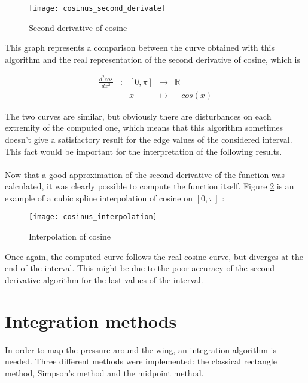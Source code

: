 \documentclass{article}
\begin{document}
\begin{figure}[h]
  \centering
  \caption{Second derivative of cosine}
  \texttt{[image: cosinus\_second\_derivate]}
  \label{cosinus_second_derivate}
\end{figure}

This graph represents a comparison between the curve obtained with this algorithm and the real representation of the second derivative of cosine, which is

\begin{equation}
\begin{array}{ccccl}
\frac{d^2 cos}{dx^2} & : & [0, \pi] & \to & \mathbb{R} \\
 & & x & \mapsto & -cos(x)
\end{array}
\end{equation}

The two curves are similar, but obviously there are disturbances on each extremity of the computed one, which means that this algorithm sometimes doesn't give a satisfactory result for the edge values of the considered interval. This fact would be important for the interpretation of the following results.\\\\

Now that a good approximation of the second derivative of the function was calculated, it was clearly possible to compute the function itself. Figure \ref{cosinus_interpolation} is an example of a cubic spline interpolation of cosine on $[0, \pi]$ :

\begin{figure}[h]
  \centering
  \caption{Interpolation of cosine}
  \texttt{[image: cosinus\_interpolation]}
  \label{cosinus_interpolation}
\end{figure}

Once again, the computed curve follows the real cosine curve, but diverges at the end of the interval. This might be due to the poor accuracy of the second derivative algorithm for the last values of the interval.

\section{Integration methods}
In order to map the pressure around the wing, an integration algorithm is needed. Three different methods were implemented: the classical rectangle method, Simpson's method and the midpoint method.
\end{document}
